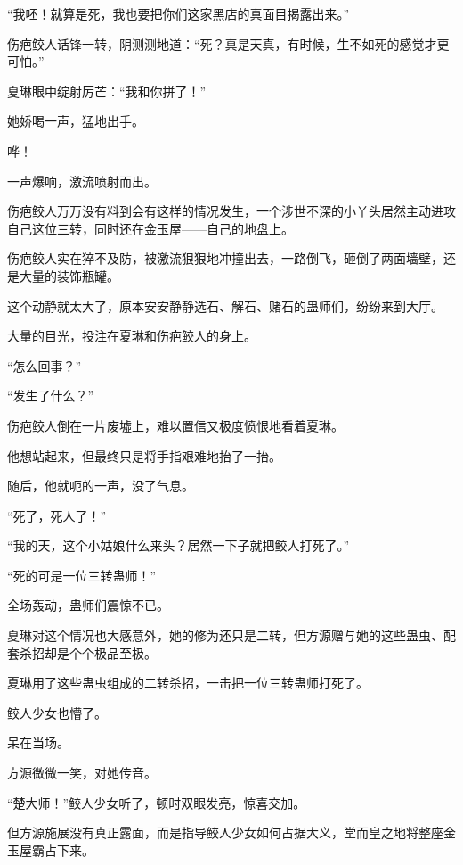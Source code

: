 \begin{this_body}
“我呸！就算是死，我也要把你们这家黑店的真面目揭露出来。”

伤疤鲛人话锋一转，阴测测地道：“死？真是天真，有时候，生不如死的感觉才更可怕。”

夏琳眼中绽射厉芒：“我和你拼了！”

她娇喝一声，猛地出手。

哗！

一声爆响，激流喷射而出。

伤疤鲛人万万没有料到会有这样的情况发生，一个涉世不深的小丫头居然主动进攻自己这位三转，同时还在金玉屋——自己的地盘上。

伤疤鲛人实在猝不及防，被激流狠狠地冲撞出去，一路倒飞，砸倒了两面墙壁，还是大量的装饰瓶罐。

这个动静就太大了，原本安安静静选石、解石、赌石的蛊师们，纷纷来到大厅。

大量的目光，投注在夏琳和伤疤鲛人的身上。

“怎么回事？”

“发生了什么？”

伤疤鲛人倒在一片废墟上，难以置信又极度愤恨地看着夏琳。

他想站起来，但最终只是将手指艰难地抬了一抬。

随后，他就呃的一声，没了气息。

“死了，死人了！”

“我的天，这个小姑娘什么来头？居然一下子就把鲛人打死了。”

“死的可是一位三转蛊师！”

全场轰动，蛊师们震惊不已。

夏琳对这个情况也大感意外，她的修为还只是二转，但方源赠与她的这些蛊虫、配套杀招却是个个极品至极。

夏琳用了这些蛊虫组成的二转杀招，一击把一位三转蛊师打死了。

鲛人少女也懵了。

呆在当场。

方源微微一笑，对她传音。

“楚大师！”鲛人少女听了，顿时双眼发亮，惊喜交加。

但方源施展没有真正露面，而是指导鲛人少女如何占据大义，堂而皇之地将整座金玉屋霸占下来。

\end{this_body}

